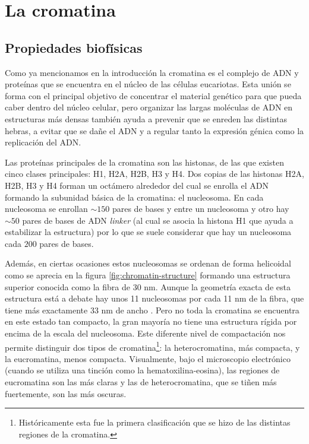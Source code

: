 \chapter{La cromatina}
\label{cap:chromatin}

\section{Propiedades biofísicas}

Como ya mencionamos en la introducción la cromatina es el complejo de ADN y proteínas que se encuentra en el núcleo de las células eucariotas. Esta unión se forma con el principal objetivo de concentrar el material genético para que pueda caber dentro del núcleo celular, pero organizar las largas moléculas de ADN en estructuras más densas también ayuda a prevenir que se enreden las distintas hebras, a evitar que se dañe el ADN y a regular tanto la expresión génica como la replicación del ADN.

Las proteínas principales de la cromatina son las histonas, de las que existen cinco clases principales: H1, H2A, H2B, H3 y H4. Dos copias de las histonas H2A, H2B, H3 y H4 forman un octámero alrededor del cual se enrolla el ADN formando la subunidad básica de la cromatina: el nucleosoma. En cada nucleosoma se enrollan $\sim150$ pares de bases y entre un nucleosoma y otro hay $\sim50$ pares de bases de ADN \textit{linker} (al cual se asocia la histona H1 que ayuda a estabilizar la estructura) por lo que se suele considerar que hay un nucleosoma cada $200$ pares de bases.

Además, en ciertas ocasiones estos nucleosomas se ordenan de forma helicoidal como se aprecia en la figura \ref{fig:chromatin-structure} formando una estructura superior conocida como la fibra de 30 nm. Aunque la geometría exacta de esta estructura está a debate hay unos 11 nucleosomas por cada 11 nm de la fibra, que tiene más exactamente 33 nm de ancho \cite{Robinson2006}. Pero no toda la cromatina se encuentra en este estado tan compacto, la gran mayoría no tiene una estructura rígida por encima de la escala del nucleosoma. Este diferente nivel de compactación nos permite distinguir dos tipos de cromatina\footnote{Históricamente esta fue la primera clasificación que se hizo de las distintas regiones de la cromatina.}: la heterocromatina, más compacta, y la eucromatina, menos compacta. Visualmente, bajo el microscopio electrónico (cuando se utiliza una tinción como la hematoxilina-eosina), las regiones de eucromatina son las más claras y las de heterocromatina, que se tiñen más fuertemente, son las más oscuras.

